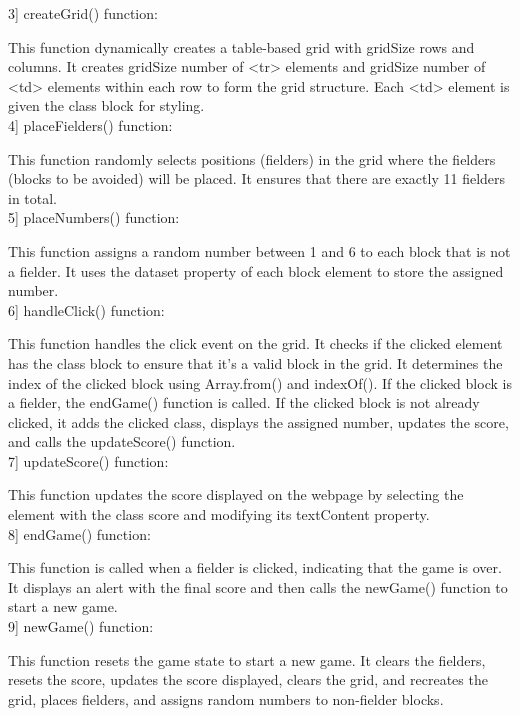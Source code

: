 \documentclass{article}
\begin{document}
3] createGrid() function:

This function dynamically creates a table-based grid with gridSize rows and columns. It creates gridSize number of <tr> elements and gridSize number of <td> elements within each row to form the grid structure. Each <td> element is given the class block for styling.\\

4] placeFielders() function:

This function randomly selects positions (fielders) in the grid where the fielders (blocks to be avoided) will be placed.
It ensures that there are exactly 11 fielders in total.\\

5] placeNumbers() function:

This function assigns a random number between 1 and 6 to each block that is not a fielder. It uses the dataset property of each block element to store the assigned number.\\

6] handleClick() function:

This function handles the click event on the grid. It checks if the clicked element has the class block to ensure that it's a valid block in the grid. It determines the index of the clicked block using Array.from() and indexOf(). If the clicked block is a fielder, the endGame() function is called. If the clicked block is not already clicked, it adds the clicked class, displays the assigned number, updates the score, and calls the updateScore() function.\\

7] updateScore() function:

This function updates the score displayed on the webpage by selecting the element with the class score and modifying its textContent property.\\

8] endGame() function:

This function is called when a fielder is clicked, indicating that the game is over. It displays an alert with the final score and then calls the newGame() function to start a new game.\\

9] newGame() function:

This function resets the game state to start a new game. It clears the fielders, resets the score, updates the score displayed, clears the grid, and recreates the grid, places fielders, and assigns random numbers to non-fielder blocks.\\
\end{document}
